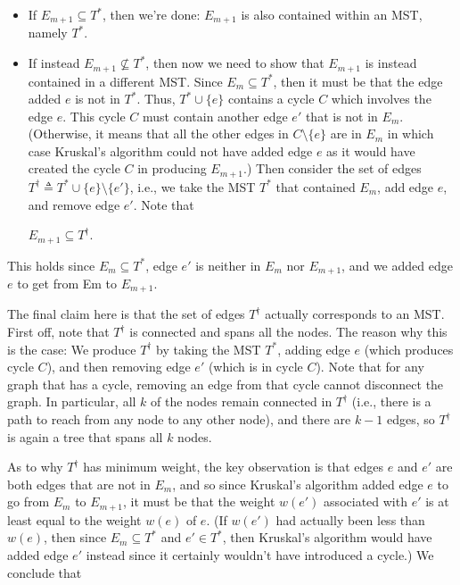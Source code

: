 \begin{itemize}
\item If $E_{m+1}\subseteq T^{*}$, then we're done: $E_{m+1}$ is also contained within an MST, namely $T^{*}$.

\item If instead $E_{m+1}\not\subseteq T^{*}$, then now we need to show that $E_{m+1}$ is instead contained in a different MST. Since $E_{m}\subseteq T^{*}$, then it must be that the edge added $e$ is not in $T^{*}$. Thus, $T^{*}\cup \{ e\}$ contains a cycle $C$ which involves the edge $e$. This cycle $C$ must contain another edge $e'$ that is not in $E_m$. (Otherwise, it means that all the other edges in $C\setminus \{ e\}$ are in $E_m$ in which case Kruskal's algorithm could not have added edge $e$ as it would have created the cycle $C$ in producing $E_{m+1}$.) Then consider the set of edges $T^{\dagger }\triangleq T^{*}\cup \{ e\} \setminus \{ e'\}$, i.e., we take the MST $T^{*}$ that contained $E_m$, add edge $e$, and remove edge $e'$. Note that

{\centering$E_{m+1}\subseteq T^{\dagger }.$ \par}

\end{itemize}
 
This holds since $E_{m}\subseteq T^{*}$, edge $e'$ is neither in $E_m$ nor $E_{m+1}$, and we added edge $e$ to get from Em to $E_{m+1}$.

The final claim here is that the set of edges $T^{\dagger }$ actually corresponds to an MST. First off, note that $T^{\dagger }$ is connected and spans all the nodes. The reason why this is the case: We produce $T^{\dagger }$ by taking the MST $T^{*}$, adding edge $e$ (which produces cycle $C$), and then removing edge $e'$ (which is in cycle $C$). Note that for any graph that has a cycle, removing an edge from that cycle cannot disconnect the graph. In particular, all $k$ of the nodes remain connected in $T^{\dagger }$ (i.e., there is a path to reach from any node to any other node), and there are $k-1$ edges, so $T^{\dagger }$ is again a tree that spans all $k$ nodes.

As to why $T^{\dagger }$ has minimum weight, the key observation is that edges $e$ and $e'$ are both edges that are not in $E_m$, and so since Kruskal's algorithm added edge $e$ to go from $E_m$ to $E_{m+1}$, it must be that the weight $w(e')$ associated with $e'$ is at least equal to the weight $w(e)$ of $e$. (If $w(e')$ had actually been less than $w(e)$, then since $E_{m}\subseteq T^{*}$ and $e'\in T^{*}$, then Kruskal's algorithm would have added edge $e'$ instead since it certainly wouldn't have introduced a cycle.) We conclude that

